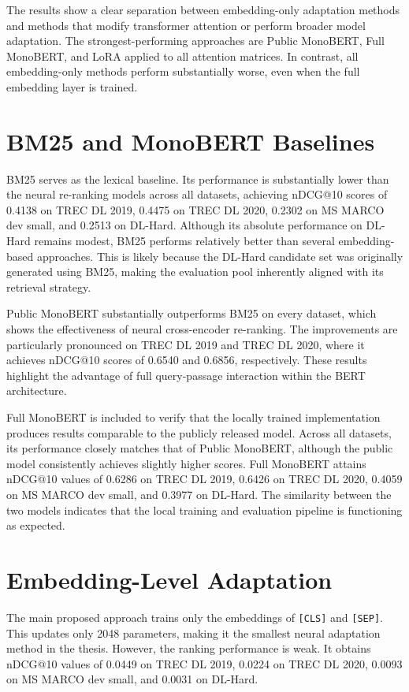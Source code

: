 The results show a clear separation between embedding-only adaptation methods and methods that modify transformer attention or perform broader model adaptation. The strongest-performing approaches are Public MonoBERT, Full MonoBERT, and LoRA applied to all attention matrices. In contrast, all embedding-only methods perform substantially worse, even when the full embedding layer is trained.

\section{BM25 and MonoBERT Baselines}
\label{sec:results_baselines}

BM25 serves as the lexical baseline. Its performance is substantially lower than the neural re-ranking models across all datasets, achieving nDCG@10 scores of 0.4138 on TREC DL 2019, 0.4475 on TREC DL 2020, 0.2302 on MS MARCO dev small, and 0.2513 on DL-Hard. Although its absolute performance on DL-Hard remains modest, BM25 performs relatively better than several embedding-based approaches. This is likely because the DL-Hard candidate set was originally generated using BM25, making the evaluation pool inherently aligned with its retrieval strategy.

Public MonoBERT substantially outperforms BM25 on every dataset, which shows the effectiveness of neural cross-encoder re-ranking. The improvements are particularly pronounced on TREC DL 2019 and TREC DL 2020, where it achieves nDCG@10 scores of 0.6540 and 0.6856, respectively. These results highlight the advantage of full query-passage interaction within the BERT architecture.

Full MonoBERT is included to verify that the locally trained implementation produces results comparable to the publicly released model. Across all datasets, its performance closely matches that of Public MonoBERT, although the public model consistently achieves slightly higher scores. Full MonoBERT attains nDCG@10 values of 0.6286 on TREC DL 2019, 0.6426 on TREC DL 2020, 0.4059 on MS MARCO dev small, and 0.3977 on DL-Hard. The similarity between the two models indicates that the local training and evaluation pipeline is functioning as expected.

\section{Embedding-Level Adaptation}
\label{sec:results_embedding}

The main proposed approach trains only the embeddings of \texttt{[CLS]} and \texttt{[SEP]}. This updates only 2048 parameters, making it the smallest neural adaptation method in the thesis. However, the ranking performance is weak. It obtains nDCG@10 values of 0.0449 on TREC DL 2019, 0.0224 on TREC DL 2020, 0.0093 on MS MARCO dev small, and 0.0031 on DL-Hard.

